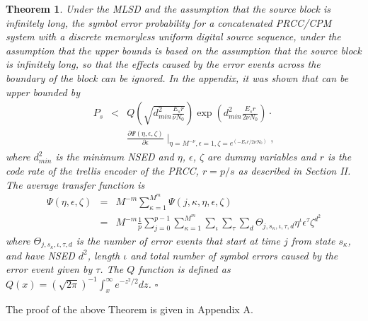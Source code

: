 \documentclass[12pt,twoside,onecolumn,a4paper,english]{IEEEtran2e}
\newtheorem{theorem}{Theorem}
\begin{document}
\begin{theorem}
Under the MLSD and the assumption that the source block is infinitely long, the symbol error probability for a concatenated PRCC/CPM system
with a discrete memoryless uniform digital source sequence, under the assumption that %
the upper bounds is based on the assumption that
the source block is infinitely long, so that the effects caused
by the error events across the boundary of the block can be
ignored.
In the appendix, it was shown that
 can be
upper bounded by %
\begin{eqnarray}\label{upboundsym2} %
P_s&{<}&Q\left(\sqrt{d_{min}^2\frac{E_sr}{\nu N_0}}\right)\exp\left(d_{min}^2\frac{E_sr}{2\nu N_0}\right){\cdot}
\nonumber\\
 &&
 \frac{{\partial}\Psi(\eta,\epsilon,\zeta)}{{\partial}\epsilon}\mid_{\eta=M^{-\nu},\epsilon=1,\zeta=e^{(-E_sr/{2\nu N_0})}},
\end{eqnarray}
where $d_{min}^2$ is the minimum NSED and $\eta$, $\epsilon$,
$\zeta$ are dummy variables \cite{SER-bound} and $r$ is the code rate of the trellis
encoder of the PRCC, $r=p/s$ as described in Section II. %
The average transfer function is %
\begin{eqnarray}%
\Psi(\eta,\epsilon,\zeta)&=&M^{-m}\sum_{\kappa=1}^{M^m}\Psi(j,\kappa,\eta,\epsilon,\zeta)\nonumber\\
&=&M^{-m}\frac{1}{p}\sum_{j=0}^{p-1}\sum_{\kappa=1}^{M^m}\sum_{\iota}\sum_{\tau}\sum_d{\Theta_{j,s_\kappa,\iota,\tau,d}}\eta^{\iota}\epsilon^{\tau}\zeta^{d^2}
\end{eqnarray}
where $\Theta_{j,s_\kappa,\iota,\tau,d}$ is the number of error
events that start at time $j$ from state $s_\kappa$, and have NSED $d^2$,
length $\iota$ and total number of symbol errors caused by the
error event given by $\tau$. The $Q$ function is defined as
$Q(x)=(\sqrt{2\pi})^{-1}\int_{x}^{\infty}e^{-z^2/2}dz$. \hspace{25ex} $\square$
\end{theorem}

The proof of the above Theorem is given in Appendix A.
\end{document}
